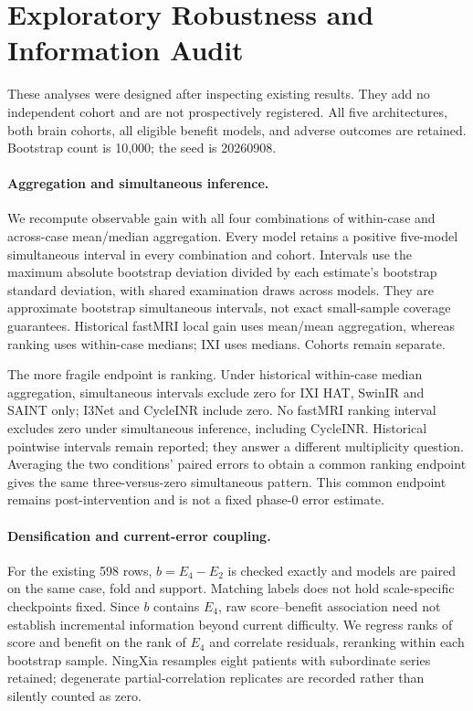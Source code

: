 \section{Exploratory Robustness and Information Audit}
These analyses were designed after inspecting existing results. They add no independent cohort and are not prospectively registered. All five architectures, both brain cohorts, all eligible benefit models, and adverse outcomes are retained. Bootstrap count is 10,000; the seed is 20260908.

\paragraph{Aggregation and simultaneous inference.}
We recompute observable gain with all four combinations of within-case and across-case mean/median aggregation. Every model retains a positive five-model simultaneous interval in every combination and cohort. Intervals use the maximum absolute bootstrap deviation divided by each estimate's bootstrap standard deviation, with shared examination draws across models. They are approximate bootstrap simultaneous intervals, not exact small-sample coverage guarantees. Historical fastMRI local gain uses mean/mean aggregation, whereas ranking uses within-case medians; IXI uses medians. Cohorts remain separate.

The more fragile endpoint is ranking. Under historical within-case median aggregation, simultaneous intervals exclude zero for IXI HAT, SwinIR and SAINT only; I3Net and CycleINR include zero. No fastMRI ranking interval excludes zero under simultaneous inference, including CycleINR. Historical pointwise intervals remain reported; they answer a different multiplicity question. Averaging the two conditions' paired errors to obtain a common ranking endpoint gives the same three-versus-zero simultaneous pattern. This common endpoint remains post-intervention and is not a fixed phase-0 error estimate.

\paragraph{Densification and current-error coupling.}
For the existing 598 rows, $b=E_4-E_2$ is checked exactly and models are paired on the same case, fold and support. Matching labels does not hold scale-specific checkpoints fixed. Since $b$ contains $E_4$, raw score--benefit association need not establish incremental information beyond current difficulty. We regress ranks of score and benefit on the rank of $E_4$ and correlate residuals, reranking within each bootstrap sample. NingXia resamples eight patients with subordinate series retained; degenerate partial-correlation replicates are recorded rather than silently counted as zero.

